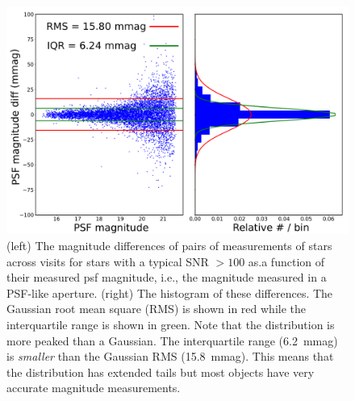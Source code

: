 \documentclass[a4paper,fleqn,usenatbib]{mnras}
\begin{document}
\begin{figure}
\centering
\includegraphics[width=0.9\columnwidth]{DC1-imsim-dithered_r_PA1.png}
\caption{(left) The magnitude differences of pairs of measurements of stars across visits for stars with a typical SNR $>100$ as.a function of their measured psf magnitude, i.e., the magnitude measured in a PSF-like aperture.  (right) The histogram of these differences.  The Gaussian root mean square (RMS) is shown in red while the interquartile range is shown in green. Note that the distribution is more peaked than a Gaussian. The interquartile range (6.2~mmag) is {\em smaller} than the Gaussian RMS (15.8~mmag). This means that the distribution has extended tails but most objects have very accurate magnitude measurements.}
\label{fig:validate_drp_PA1}
\end{figure}
\end{document}
